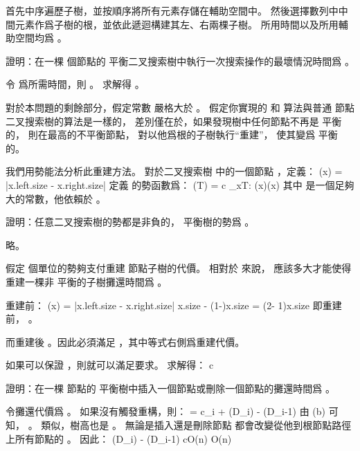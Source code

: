 \startANSWER
首先中序遍歷子樹，並按順序將所有元素存儲在輔助空間中。
然後選擇數列中中間元素作爲子樹的根，並依此遞迴構建其左、右兩棵子樹。
所用時間以及所用輔助空間均爲 。
\stopANSWER

\startigBase[continue]\startitem
證明：在一棵  個節點的 \m{\alpha} 平衡二叉搜索樹中執行一次搜索操作的最壞情況時間爲 。
\stopitem\stopigBase

\startANSWER
令  爲所需時間，則 。
求解得 。
\stopANSWER

對於本問題的剩餘部分，假定常數 \m{\alpha} 嚴格大於 。
假定你實現的  和  算法與普通  節點二叉搜索樹的算法是一樣的，
差別僅在於，如果發現樹中任何節點不再是 \m{\alpha} 平衡的，
則在最高的不平衡節點，
對以他爲根的子樹執行“重建”，
使其變爲  平衡的。

我們用勢能法分析此重建方法。
對於二叉搜索樹  中的一個節點 ，定義：
\startformula
\Delta(x) = |x.left.size - x.right.size|
\stopformula
定義  的勢函數爲：
\startformula
\Phi(T) = c \sum_{x\in T: \Delta(x)}\Delta(x)
\stopformula
其中  是一個足夠大的常數，他依賴於 \m{\alpha}。

\startigBase[continue]\startitem
證明：任意二叉搜索樹的勢都是非負的，  平衡樹的勢爲 。
\stopitem\stopigBase

\startANSWER
略。
\stopANSWER

\startigBase[continue]\startitem
假定  個單位的勢夠支付重建  節點子樹的代價。
相對於 \m{\alpha} 來說，  應該多大才能使得重建一棵非 \m{\alpha} 平衡的子樹攤還時間爲 。
\stopitem\stopigBase

\startANSWER
重建前：
\startformula
\Delta(x)
= |x.left.size - x.right.size|
\ge \alpha \cdot x.size - (1-\alpha)\cdot x.size
= (2\alpha - 1)\cdot x.size
\stopformula
即重建前， 。

而重建後 。因此必須滿足 ，其中等式右側爲重建代價。

如果可以保證 ，則就可以滿足要求。
求解得：
\startformula
c\ge {}
\stopformula
\stopANSWER

\startigBase[continue]\startitem
證明：在一棵  節點的 \m{\alpha} 平衡樹中插入一個節點或刪除一個節點的攤還時間爲 。
\stopitem\stopigBase

\startANSWER
令攤還代價爲 。
如果沒有觸發重構，則：
\startformula
{} = c_i + \Phi(D_i) - \Phi(D_{i-1})
\stopformula
由 (b) 可知， 。
類似，樹高也是 。
無論是插入還是刪除節點  都會改變從他到根節點路徑上所有節點的 。
因此：
\startformula
\Phi(D_i) - \Phi(D_{i-1}) \le c\cdot O(\lg n) \in O(\lg n)
\stopformula

